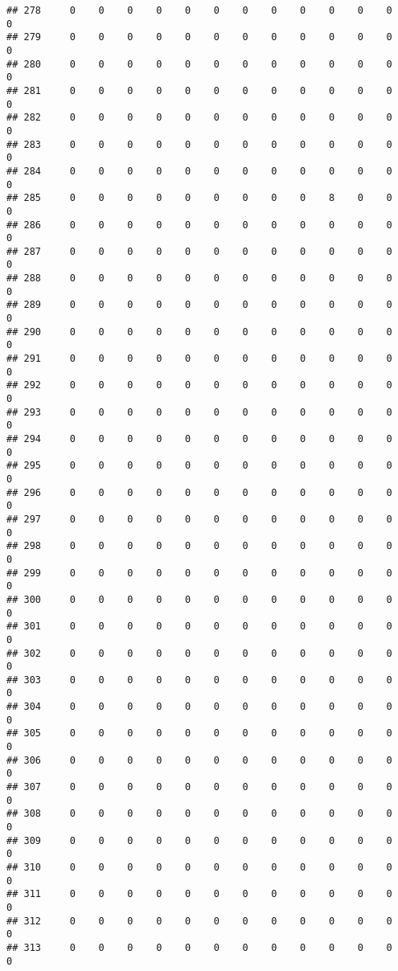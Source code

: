 \documentclass[]{article}
\begin{document}
\begin{verbatim}
## 278     0    0    0    0    0    0    0    0    0    0    0    0    0
## 279     0    0    0    0    0    0    0    0    0    0    0    0    0
## 280     0    0    0    0    0    0    0    0    0    0    0    0    0
## 281     0    0    0    0    0    0    0    0    0    0    0    0    0
## 282     0    0    0    0    0    0    0    0    0    0    0    0    0
## 283     0    0    0    0    0    0    0    0    0    0    0    0    0
## 284     0    0    0    0    0    0    0    0    0    0    0    0    0
## 285     0    0    0    0    0    0    0    0    0    8    0    0    0
## 286     0    0    0    0    0    0    0    0    0    0    0    0    0
## 287     0    0    0    0    0    0    0    0    0    0    0    0    0
## 288     0    0    0    0    0    0    0    0    0    0    0    0    0
## 289     0    0    0    0    0    0    0    0    0    0    0    0    0
## 290     0    0    0    0    0    0    0    0    0    0    0    0    0
## 291     0    0    0    0    0    0    0    0    0    0    0    0    0
## 292     0    0    0    0    0    0    0    0    0    0    0    0    0
## 293     0    0    0    0    0    0    0    0    0    0    0    0    0
## 294     0    0    0    0    0    0    0    0    0    0    0    0    0
## 295     0    0    0    0    0    0    0    0    0    0    0    0    0
## 296     0    0    0    0    0    0    0    0    0    0    0    0    0
## 297     0    0    0    0    0    0    0    0    0    0    0    0    0
## 298     0    0    0    0    0    0    0    0    0    0    0    0    0
## 299     0    0    0    0    0    0    0    0    0    0    0    0    0
## 300     0    0    0    0    0    0    0    0    0    0    0    0    0
## 301     0    0    0    0    0    0    0    0    0    0    0    0    0
## 302     0    0    0    0    0    0    0    0    0    0    0    0    0
## 303     0    0    0    0    0    0    0    0    0    0    0    0    0
## 304     0    0    0    0    0    0    0    0    0    0    0    0    0
## 305     0    0    0    0    0    0    0    0    0    0    0    0    0
## 306     0    0    0    0    0    0    0    0    0    0    0    0    0
## 307     0    0    0    0    0    0    0    0    0    0    0    0    0
## 308     0    0    0    0    0    0    0    0    0    0    0    0    0
## 309     0    0    0    0    0    0    0    0    0    0    0    0    0
## 310     0    0    0    0    0    0    0    0    0    0    0    0    0
## 311     0    0    0    0    0    0    0    0    0    0    0    0    0
## 312     0    0    0    0    0    0    0    0    0    0    0    0    0
## 313     0    0    0    0    0    0    0    0    0    0    0    0    0

\end{verbatim}
\end{document}
